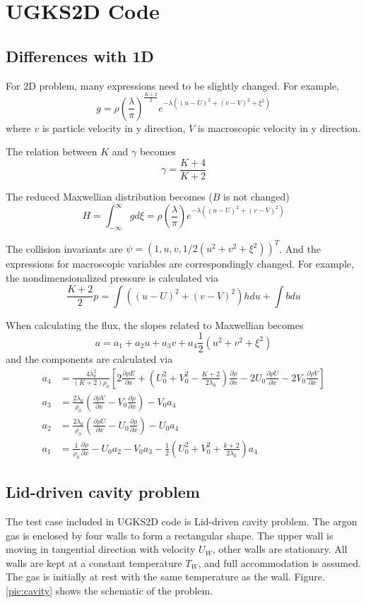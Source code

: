 \documentclass[a4paper]{book}
\begin{document}
\section{UGKS2D Code}
\subsection{Differences with 1D}
For 2D problem, many expressions need to be slightly changed. For example,
$$g=\rho\left(\frac{\lambda}{\pi}\right)^{\frac{K+2}{2}}e^{-\lambda((u-U)^2+(v-V)^2+\xi^2)}$$
where $v$ is particle velocity in y direction, $V$ is macroscopic velocity in y direction. 

The relation between $K$ and $\gamma$ becomes
$$\gamma=\frac{K+4}{K+2}$$

The reduced Maxwellian distribution becomes ($B$ is not changed)
$$H=\int_{-\infty}^{\infty}gd\xi=\rho\left(\frac{\lambda}{\pi}\right)e^{-\lambda((u-U)^2+(v-V)^2)}$$

The collision invariants are $\psi=(1,u,v,1/2(u^2+v^2+\xi^2))^T$. And the expressions for macroscopic variables are correspondingly changed. For example, the nondimensionalized pressure is calculated via
$$\frac{K+2}{2}p=\int((u-U)^2+(v-V)^2)hdu+\int bdu$$

When calculating the flux, the slopes related to Maxwellian becomes
$$a=a_1+a_2u+a_3v+a_4\frac{1}{2}(u^2+v^2+\xi^2)$$
and the components are calculated via
$$
\begin{aligned}
    a_4&=\frac{4\lambda_0^2}{(K+2)\rho_0}\left[2\frac{\partial\rho E}{\partial x}+\left(U_0^2+V_0^2-\frac{K+2}{2\lambda_0}\right)\frac{\partial\rho}{\partial x}-2U_0\frac{\partial\rho U}{\partial x}-2V_0\frac{\partial\rho V}{\partial x}\right]\\
    a_3&=\frac{2\lambda_0}{\rho_0}\left(\frac{\partial\rho V}{\partial x}-V_0\frac{\partial\rho}{\partial x}\right)-V_0a_4\\
    a_2&=\frac{2\lambda_0}{\rho_0}\left(\frac{\partial\rho U}{\partial x}-U_0\frac{\partial\rho}{\partial x}\right)-U_0a_4\\
    a_1&=\frac{1}{\rho_0}\frac{\partial\rho}{\partial x}-U_0a_2-V_0a_3-\frac{1}{2}\left(U_0^2+V_0^2+\frac{k+2}{2\lambda_0}\right)a_4
\end{aligned}
$$

\subsection{Lid-driven cavity problem}
The test case included in UGKS2D code is Lid-driven cavity problem\cite{Huang2012}. The argon gas is enclosed by four walls to form a rectangular shape. The upper wall is moving in tangential direction with velocity $U_W$, other walls are stationary. All walls are kept at a constant temperature $T_W$, and full accommodation is assumed. The gas is initially at rest with the same temperature as the wall.  Figure. \ref{pic:cavity} shows the schematic of the problem.
\end{document}
